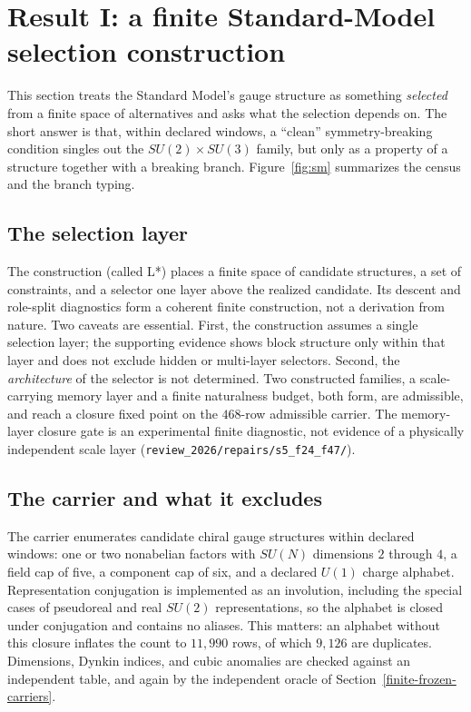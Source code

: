 \section{Result I: a finite Standard-Model selection construction}\label{result-i-the-standard-model-as-a-selection-layer-a-demarcation}

This section treats the Standard Model's gauge structure as something \emph{selected} from a finite space of
alternatives and asks what the selection depends on. The short answer is that, within declared windows, a ``clean''
symmetry-breaking condition singles out the \(SU(2)\times SU(3)\) family, but only as a property of a structure
together with a breaking branch. Figure~\ref{fig:sm} summarizes the census and the branch typing.

\subsection{The selection layer}\label{the-problem-restated-structurally}

The construction (called L*) places a finite space of candidate structures, a set of constraints, and a selector one
layer above the realized candidate. Its descent and role-split diagnostics form a coherent finite construction, not
a derivation from nature. Two caveats are essential. First, the construction assumes a single selection layer; the
supporting evidence shows block structure only within that layer and does not exclude hidden or multi-layer selectors.
Second, the \emph{architecture} of the selector is not determined. Two constructed families, a scale-carrying memory
layer and a finite naturalness budget, both form, are admissible, and reach a closure fixed point on the \(468\)-row
admissible carrier. The memory-layer closure gate is an experimental finite diagnostic, not evidence of a physically
independent scale layer (\nolinkurl{review_2026/repairs/s5_f24_f47/}).

\subsection{The carrier and what it excludes}\label{unconditional-exclusion-sim-99.3-of-chiral-gauge-structures}

The carrier enumerates candidate chiral gauge structures within declared windows: one or two nonabelian factors
with \(SU(N)\) dimensions \(2\) through \(4\), a field cap of five, a component cap of six, and a declared
\(U(1)\) charge alphabet. Representation conjugation is implemented as an involution, including the special cases of
pseudoreal and real \(SU(2)\) representations, so the alphabet is closed under conjugation and contains no aliases.
This matters: an alphabet without this closure inflates the count to \(11{,}990\) rows, of which \(9{,}126\) are
duplicates. Dimensions, Dynkin indices, and cubic anomalies are checked against an independent table, and again by the
independent oracle of Section~\ref{finite-frozen-carriers}.

